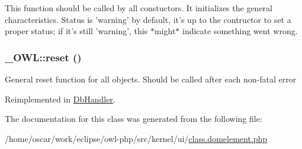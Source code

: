 This function should be called by all constuctors. It initializes the general characteristics. Status is 'warning' by default, it's up to the contructor to set a proper status; if it's still 'warning', this $\ast$might$\ast$ indicate something went wrong. \hypertarget{class__OWL_2f2a042bcf31965194c03033df0edc9b}{
\subsubsection{\setlength{\rightskip}{0pt plus 5cm}\_\-OWL::reset ()}}
\label{class__OWL_2f2a042bcf31965194c03033df0edc9b}


General reset function for all objects. Should be called after each non-fatal error 

Reimplemented in \hyperlink{classDbHandler_9982df4830f05803935bb31bac7fae3d}{DbHandler}.

The documentation for this class was generated from the following file:\begin{CompactItemize}
\item 
/home/oscar/work/eclipse/owl-php/src/kernel/ui/\hyperlink{class_8domelement_8php}{class.domelement.php}\end{CompactItemize}
